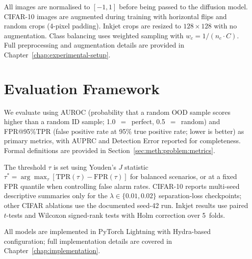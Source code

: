 All images are normalised to $[-1, 1]$ before being passed to the diffusion model. CIFAR-10 images are augmented during training with horizontal flips and random crops (4-pixel padding). Inkjet crops are resized to $128 \times 128$ with no augmentation. Class balancing uses weighted sampling with $w_c = 1/(n_c \cdot C)$. Full preprocessing and augmentation details are provided in Chapter~\ref{chap:experimental-setup}.


\section{Evaluation Framework}
\label{sec:meth:evaluation}

We evaluate using AUROC (probability that a random OOD sample scores higher than a random ID sample; 1.0~$=$~perfect, 0.5~$=$~random) and FPR@95\%TPR (false positive rate at 95\% true positive rate; lower is better) as primary metrics, with AUPRC and Detection Error reported for completeness. Formal definitions are provided in Section~\ref{sec:meth:problem:metrics}.

The threshold $\tau$ is set using Youden's $J$ statistic $\tau^* = \arg\max_\tau[\text{TPR}(\tau) - \text{FPR}(\tau)]$ for balanced scenarios, or at a fixed FPR quantile when controlling false alarm rates. CIFAR-10 reports multi-seed descriptive summaries only for the $\lambda \in \{0.01, 0.02\}$ separation-loss checkpoints; other CIFAR ablations use the documented seed-42 run. Inkjet results use paired $t$-tests and Wilcoxon signed-rank tests with Holm correction over 5~folds.

All models are implemented in PyTorch Lightning with Hydra-based configuration; full implementation details are covered in Chapter~\ref{chap:implementation}.
\endgroup
